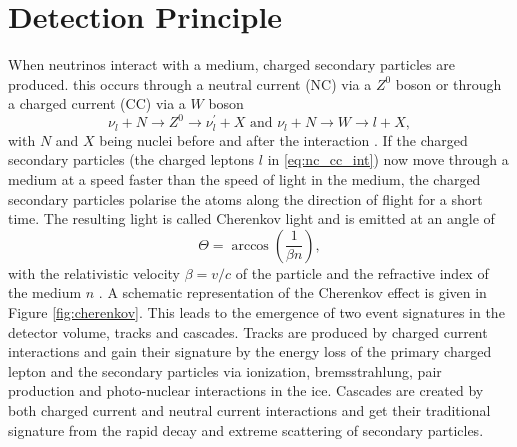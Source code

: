 \section{Detection Principle}

When neutrinos interact with a medium, charged secondary particles are produced.
this occurs through a neutral current (NC) via a $Z^0$ boson or through a charged current (CC) via a $W$ boson
\begin{equation}
  \nu_l + N \rightarrow Z^0 \rightarrow \nu^{\prime}_l + X \text{ and }  \nu_l + N \rightarrow W \rightarrow l + X, \label{eq:nc_cc_int}
\end{equation}
with $N$ and $X$ being nuclei before and after the interaction \cite{Ahlers_2018}.
If the charged secondary particles (the charged leptons $l$ in \eqref{eq:nc_cc_int}) now move through a medium at a speed faster than the speed of light in the medium, the charged secondary particles polarise the atoms along the direction of flight for a short time.
The resulting light is called Cherenkov light and is emitted at an angle of
\begin{equation}
  \Theta = \arccos{\left(\frac{1}{\beta n}\right)}, \label{eq:cherenkov}
\end{equation}
with the relativistic velocity $\beta=v/c$ of the particle and the refractive index of the medium $n$ \cite{PhysRev52378,spiering}.
A schematic representation of the Cherenkov effect is given in Figure \ref{fig:cherenkov}.
This leads to the emergence of two event signatures in the detector volume, tracks and cascades.
Tracks are produced by charged current interactions and gain their signature by the energy loss of the primary charged lepton and the secondary particles via ionization, bremsstrahlung, pair production and photo-nuclear interactions in the ice.
Cascades are created by both charged current and neutral current interactions and get their traditional signature from the rapid decay and extreme scattering of secondary particles.
